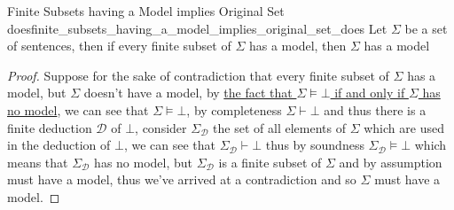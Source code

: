 \begin{proposition}{Finite Subsets having a Model implies Original Set
does}{finite_subsets_having_a_model_implies_original_set_does}
Let \( \Sigma  \) be a set of sentences, then if every finite subset of \(
\Sigma  \) has a model, then \( \Sigma  \) has a model
\end{proposition}
\begin{proof}
    Suppose for the sake of contradiction that every finite subset of \(
    \Sigma  \)  has a model, but \( \Sigma  \) doesn't have a model, by
    \hyperref[proposition:implying_a_contradiction_means_no_model]{the fact
    that \( \Sigma \models \bot  \) if and only if \( \Sigma  \) has no model},
    we can see that \( \Sigma \models \bot  \), by completeness \( \Sigma \vdash
    \bot \) and thus there is a finite deduction \( \mathcal{ D }   \) of \(
    \bot  \), consider \( \Sigma _{ \mathcal{ D }   }  \) the set of all
    elements of \( \Sigma \) which are used in the deduction of \( \bot  \), we
    can see that \( \Sigma _{ \mathcal{ D }   } \vdash \bot \) thus by soundness
    \( \Sigma _{ \mathcal{ D}   } \models \bot  \) which means that \( \Sigma _{
    \mathcal{ D }   }  \) has no model, but \( \Sigma _{ \mathcal{ D }   }  \)
    is a finite subset of \( \Sigma  \) and by assumption must have a model,
    thus we've arrived at a contradiction and so \( \Sigma  \) must have a
    model.
\end{proof}
